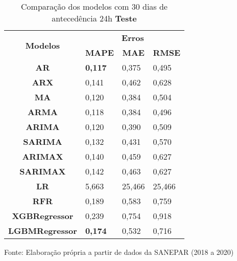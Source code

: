 \begin{table}[H]
	\centering
	\caption{Comparação dos modelos com 30 dias de antecedência 24h \textbf{Teste} }\label{tb:60-24tst}
	\begin{tabular}{@{}clll@{}}
		\toprule
		\multirow{2}{*}{\textbf{Modelos}} & \multicolumn{3}{c}{\textbf{Erros}}                                                                       \\ \cmidrule(l){2-4} 
		& \multicolumn{1}{c}{\textbf{MAPE}} & \multicolumn{1}{c}{\textbf{MAE}} & \multicolumn{1}{c}{\textbf{RMSE}} \\ \hline
\textbf{AR}                       & \textbf{0,117}                             & 0,375                            & 0,495                             \\
\textbf{ARX}                      & 0,141                             & 0,462                            & 0,628                             \\
\textbf{MA}                       & 0,120                             & 0,384                            & 0,504                             \\
\textbf{ARMA}                     & 0,118                             & 0,384                            & 0,496                             \\
\textbf{ARIMA}                    & 0,120                             & 0,390                            & 0,509                             \\
\textbf{SARIMA}                   & 0,132                             & 0,431                            & 0,570                             \\
\textbf{ARIMAX}                   & 0,140                             & 0,459                            & 0,627                             \\
\textbf{SARIMAX}                  & 0,142                             & 0,463                            & 0,627                             \\
\textbf{LR}                       & 5,663                             & 25,466                           & 25,466                            \\
\textbf{RFR}                      & 0,189                             & 0,583                            & 0,759                             \\
\textbf{XGBRegressor}             & 0,239                             & 0,754                            & 0,918                             \\
\textbf{LGBMRegressor}            & \textbf{0,174}                             & 0,532                            & 0,716                             \\ \bottomrule
	\end{tabular}

Fonte: Elaboração própria a partir de dados da SANEPAR (2018 a 2020)
\end{table}

